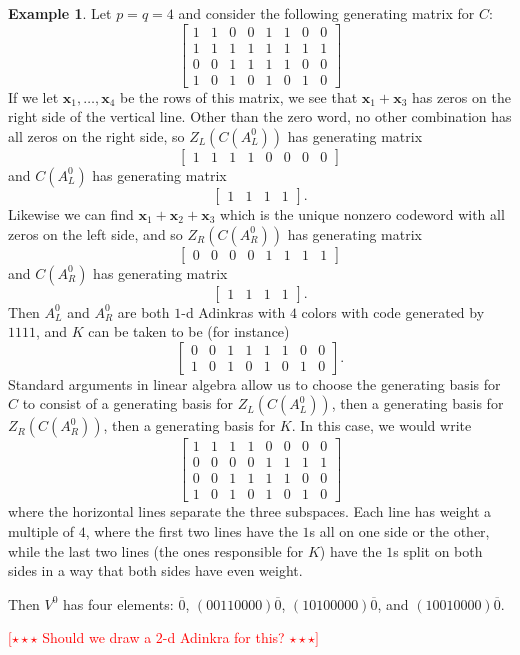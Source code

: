 \documentclass[12pt,twoside,singlespace]{article}
\numberwithin{equation}{section}
\theoremstyle{definition}
\newtheorem{ex}[equation]{Example}
\newcommand{\com}[1]{\textcolor{red}{$[\star \star \star$ #1 $\star \star \star]$}}
\renewcommand{\vec}[1]{\mathbf{#1}}
\begin{document}
\begin{ex}
Let $p=q=4$ and consider the following generating matrix for $C$:
\[\left[\begin{array}{cccc|cccc}
1&1&0&0&1&1&0&0\\
1&1&1&1&1&1&1&1\\
0&0&1&1&1&1&0&0\\
1&0&1&0&1&0&1&0
\end{array}\right]\]
If we let $\vec{x}_1, \ldots, \vec{x}_4$ be the rows of this matrix, we see that $\vec{x}_1+\vec{x}_3$ has zeros on the right side of the vertical line.  Other than the zero word, no other combination has all zeros on the right side, so $Z_L(C(A_L^0))$ has generating matrix
\[\left[\begin{array}{cccc|cccc}
1&1&1&1&0&0&0&0
\end{array}\right]\]
and $C(A_L^0)$ has generating matrix
\[\left[\begin{array}{cccc}
1&1&1&1
\end{array}\right].\]
Likewise we can find $\vec{x}_1+\vec{x}_2+\vec{x}_3$ which is the unique nonzero codeword with all zeros on the left side, and so $Z_R(C(A_R^0))$ has generating matrix
\[\left[\begin{array}{cccc|cccc}
0&0&0&0&1&1&1&1
\end{array}\right]\]
and $C(A_R^0)$ has generating matrix
\[\left[\begin{array}{cccc}
1&1&1&1
\end{array}\right].\]
Then $A_L^0$ and $A_R^0$ are both $1$-d Adinkras with $4$ colors with code generated by $1111$, and $K$ can be taken to be (for instance)
\[\left[\begin{array}{cccc|cccc}
0&0&1&1&1&1&0&0\\
1&0&1&0&1&0&1&0
\end{array}\right].\]
Standard arguments in linear algebra allow us to choose the generating basis for $C$ to consist of a generating basis for $Z_L(C(A_L^0))$, then a generating basis for $Z_R(C(A_R^0))$, then a generating basis for $K$.  In this case, we would write
\[\left[\begin{array}{cccc|cccc}
1&1&1&1&0&0&0&0\\\hline
0&0&0&0&1&1&1&1\\\hline
0&0&1&1&1&1&0&0\\
1&0&1&0&1&0&1&0
\end{array}\right]\]
where the horizontal lines separate the three subspaces.  Each line has weight a multiple of $4$, where the first two lines have the $1$s all on one side or the other, while the last two lines (the ones responsible for $K$) have the $1$s split on both sides in a way that both sides have even weight.

Then $V^0$ has four elements: $\overline{0}$, $(00110000)\overline{0}$, $(10100000)\overline{0}$, and $(10010000)\overline{0}$.

\com{Should we draw a $2$-d Adinkra for this?}
\end{ex}
\end{document}
